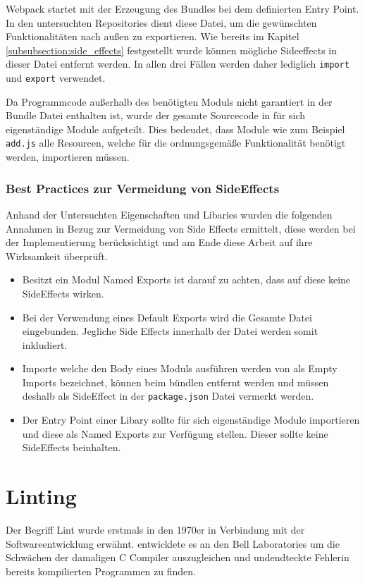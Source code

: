 Webpack startet mit der Erzeugung des Bundles bei dem definierten Entry Point. In den untersuchten Repositories dient diese Datei, um die gewünschten Funktionalitäten nach außen zu exportieren. Wie bereits im Kapitel \ref{subsubsection:side_effects} festgestellt wurde können mögliche Sideeffects in dieser Datei entfernt werden. In allen drei Fällen werden daher lediglich \lstinline{import} und \lstinline{export} verwendet.

Da Programmcode außerhalb des benötigten Moduls nicht garantiert in der Bundle Datei enthalten ist, wurde der gesamte Sourcecode in für sich eigenständige Module aufgeteilt. Dies bedeudet, dass Module wie zum Beispiel \lstinline{add.js} alle Resourcen, welche für die ordnungsgemäße Funktionalität benötigt werden, importieren müssen.

\subsubsection{Best Practices zur Vermeidung von SideEffects}

Anhand der Untersuchten Eigenschaften und Libaries wurden die folgenden Annahmen in Bezug zur Vermeidung von Side Effects ermittelt, diese werden bei der Implementierung berücksichtigt und am Ende diese Arbeit auf ihre Wirksamkeit überprüft.

\begin{itemize}
\item Besitzt ein Modul Named Exports ist darauf zu achten, dass auf diese keine SideEffects wirken.
\item Bei der Verwendung eines Default Exports wird die Gesamte Datei eingebunden. Jegliche Side Effects innerhalb der Datei werden somit inkludiert.
\item Importe welche den Body eines Moduls ausführen werden von \textcite{Rauschmayer2018} als Empty Imports bezeichnet, können beim bündlen entfernt werden und müssen deshalb als SideEffect in der \lstinline{package.json} Datei vermerkt werden.
\item Der Entry Point einer Libary sollte für sich eigenständige Module importieren und diese als Named Exports zur Verfügung stellen. Dieser sollte keine SideEffects beinhalten.
\end{itemize}

\section{Linting}
Der Begriff Lint wurde erstmals in den 1970er in Verbindung mit der Softwareentwicklung erwähnt. \textcite{Johnson1978} entwicklete es an den Bell Laboratories um die Schwächen der damaligen C Compiler auszugleichen und undendteckte Fehlerin bereits kompilierten Programmen zu finden.


